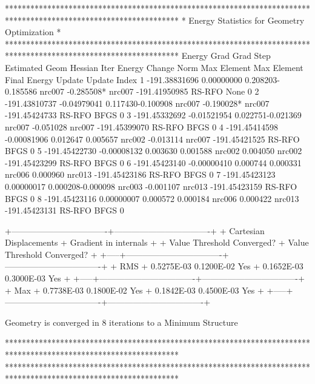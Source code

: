 \begin{sourcelisting}
*****************************************************************************************************************
*                                  Energy Statistics for Geometry Optimization                                  *
*****************************************************************************************************************
                       Energy     Grad     Grad              Step                 Estimated   Geom     Hessian
Iter      Energy       Change     Norm     Max    Element    Max     Element     Final Energy Update Update Index
  1   -191.38831696  0.00000000 0.208203-0.185586 nrc007  -0.285508* nrc007     -191.41950985 RS-RFO  None    0
  2   -191.43810737 -0.04979041 0.117430-0.100908 nrc007  -0.190028* nrc007     -191.45424733 RS-RFO  BFGS    0
  3   -191.45332692 -0.01521954 0.022751-0.021369 nrc007  -0.051028  nrc007     -191.45399070 RS-RFO  BFGS    0
  4   -191.45414598 -0.00081906 0.012647 0.005657 nrc002  -0.013114  nrc007     -191.45421525 RS-RFO  BFGS    0
  5   -191.45422730 -0.00008132 0.003630 0.001588 nrc002   0.004050  nrc002     -191.45423299 RS-RFO  BFGS    0
  6   -191.45423140 -0.00000410 0.000744 0.000331 nrc006   0.000960  nrc013     -191.45423186 RS-RFO  BFGS    0
  7   -191.45423123  0.00000017 0.000208-0.000098 nrc003  -0.001107  nrc013     -191.45423159 RS-RFO  BFGS    0
  8   -191.45423116  0.00000007 0.000572 0.000184 nrc006   0.000422  nrc013     -191.45423131 RS-RFO  BFGS    0

       +----------------------------------+----------------------------------+
       +    Cartesian Displacements       +    Gradient in internals         +
       +  Value      Threshold Converged? +  Value      Threshold Converged? +
 +-----+----------------------------------+----------------------------------+
 + RMS + 0.5275E-03  0.1200E-02     Yes   + 0.1652E-03  0.3000E-03     Yes   +
 +-----+----------------------------------+----------------------------------+
 + Max + 0.7738E-03  0.1800E-02     Yes   + 0.1842E-03  0.4500E-03     Yes   +
 +-----+----------------------------------+----------------------------------+

 Geometry is converged in   8 iterations to a Minimum Structure

*****************************************************************************************************************
*****************************************************************************************************************
\end{sourcelisting}

